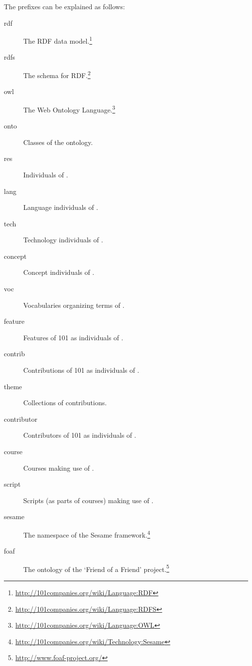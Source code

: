 \noindent
The prefixes can be explained as follows:
%
\begin{description}
\item[rdf] The RDF data model.\footnote{\url{http://101companies.org/wiki/Language:RDF}}
\item[rdfs] The schema for RDF.\footnote{\url{http://101companies.org/wiki/Language:RDFS}}
\item[owl] The Web Ontology Language.\footnote{\url{http://101companies.org/wiki/Language:OWL}}
\item[onto] Classes of the \solasote{} ontology.
\item[res] Individuals of \solasote.
\item[lang] Language individuals of \solasote.
\item[tech] Technology individuals of \solasote.
\item[concept] Concept individuals of \solasote.
\item[voc] Vocabularies organizing terms of \solasote.
\item[feature] Features of 101 as individuals of \solasote.
\item[contrib] Contributions of 101 as individuals of \solasote.
\item[theme] Collections of contributions.
\item[contributor] Contributors of 101 as individuals of \solasote.
\item[course] Courses making use of \solasote.
\item[script] Scripts (as parts of courses) making use of \solasote.
\item[sesame] The namespace of the Sesame framework.\footnote{\url{http://101companies.org/wiki/Technology:Sesame}}
\item[foaf] The ontology of the `Friend of a Friend' project.\footnote{\url{http://www.foaf-project.org/}}
\end{description}

